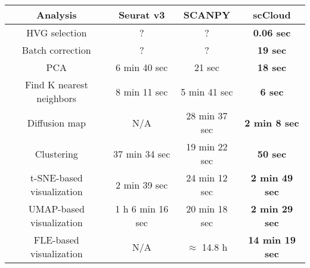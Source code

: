 \documentclass[10pt]{article}
\begin{document}
\begin{table}[H]
	\centering
	\begin{tabular}{|c|c|c|c|}
		\hline
		Analysis & Seurat v3 & SCANPY & scCloud\\
		\hline \hline
		HVG selection & ? & ? & \textbf{0.06 sec} \\
		\hline
		Batch correction & ? & ? & \textbf{19 sec} \\
		\hline
		PCA & 6 min 40 sec & 21 sec & \textbf{18 sec} \\
		\hline
		Find K nearest neighbors & 8 min 11 sec &  5 min 41 sec & \textbf{6 sec}\\
		\hline
		Diffusion map & N/A & 28 min 37 sec & \textbf{2 min 8 sec} \\
		\hline 
		Clustering & 37 min 34 sec & 19 min 22 sec & \textbf{50 sec}\\
		\hline
		t-SNE-based visualization & 2 min 39 sec & 24 min 12 sec & \textbf{2 min 49 sec}\\
		\hline
		UMAP-based visualization & 1 h 6 min 16 sec & 20 min 18 sec & \textbf{2 min 29 sec}\\
		\hline
		FLE-based visualization & N/A & $\approx$ 14.8  h & \textbf{14 min 19 sec}\\
		\hline
	\end{tabular}
\end{table}
\end{document}
